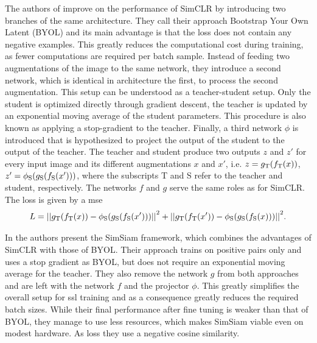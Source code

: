 The authors of \cite{Grill:2020aaa} improve on the performance of SimCLR by introducing two branches of the same architecture. They call their approach Bootstrap Your Own Latent (BYOL) and its main advantage is that the loss does not contain any negative examples. This greatly reduces the computational cost during training, as fewer computations are required per batch sample. Instead of feeding two augmentations of the image to the same network, they introduce a second network, which is identical in architecture the first, to process the second augmentation. This setup can be understood as a teacher-student setup. Only the student is optimized directly through gradient descent, the teacher is updated by an exponential moving average of the student parameters. This procedure is also known as applying a stop-gradient to the teacher. Finally, a third network $\phi$ is introduced that is hypothesized to project the output of the student to the output of the teacher. The teacher and student produce two outputs $z$ and $z'$ for every input image and its different augmentations $x$ and $x'$, i.e. $z=g_\text{T}{\left( f_\text{T}{\left( x \right)} \right)}$, $z'=\phi_\text{S}{\left( g_\text{S}{\left( f_\text{S}{\left( x' \right)} \right)} \right)}$, where the subscripts T and S refer to the teacher and student, respectively. The networks $f$ and $g$ serve the same roles as for SimCLR. The loss is given by a \acrshort{mse}
\begin{equation}
L={\left|\left| g_\text{T}{\left( f_\text{T}{\left( x \right)} \right)} - \phi_\text{S}{\left( g_\text{S}{\left( f_\text{S}{\left( x' \right)} \right)} \right)} \right|\right|}^2 + {\left|\left| g_\text{T}{\left( f_\text{T}{\left( x' \right)} \right)} - \phi_\text{S}{\left( g_\text{S}{\left( f_\text{S}{\left( x \right)} \right)} \right)} \right|\right|}^2.
\end{equation}

In \cite{Chen:2020aaa} the authors present the SimSiam framework, which combines the advantages of SimCLR with those of BYOL. Their approach trains on positive pairs only and uses a stop gradient as BYOL, but does not require an exponential moving average for the teacher. They also remove the network $g$ from both approaches and are left with the network $f$ and the projector $\phi$. This greatly simplifies the overall setup for \acrshort{ssl} training and as a consequence greatly reduces the required batch sizes. While their final performance after fine tuning is weaker than that of BYOL, they manage to use less resources, which makes SimSiam viable even on modest hardware. As loss they use a negative cosine similarity.

